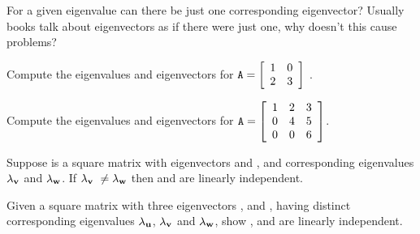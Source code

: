 \noindent {} For a given eigenvalue can there be just one corresponding eigenvector? Usually books talk about eigenvectors as if there were just one, why doesn't this cause problems? 

\begin{myexb}[\bd{b}]
		Compute the eigenvalues and eigenvectors for   $\texttt{A} = \left[ \begin{array}{rr}  1 & 0 \\ 2 & 3  \end{array} \right]$ .
\end{myexb}

\begin{myexc}[\bd{c}]
	Compute the eigenvalues and eigenvectors for   $\texttt{A} = \left[ \begin{array}{rrr} 1 & 2 & 3 \\ 0 & 4 & 5 \\ 0 & 0 & 6 \end{array} \right]$.
\end{myexc}



\begin{theorem}
	Suppose  is a square matrix with eigenvectors  and , and corresponding eigenvalues $\lambda_{\mathbf{v}}$ and $\lambda_{\mathbf{w}}$. If $\lambda_{\mathbf{v}}\ \neq \lambda_{\mathbf{w}}$ then  and  are linearly independent. 
\end{theorem}
\vspace{-.3in}\hspace{5in}\begin{annotation}
\end{annotation}

\vspace{.5cm}

\noindent {} Given a square matrix  with three eigenvectors ,  and , having distinct corresponding eigenvalues $\lambda_{\mathbf{u}}$, $\lambda_{\mathbf{v}}$ and $\lambda_{\mathbf{w}}$, show ,  and  are linearly independent. 

\vspace{.5cm}

